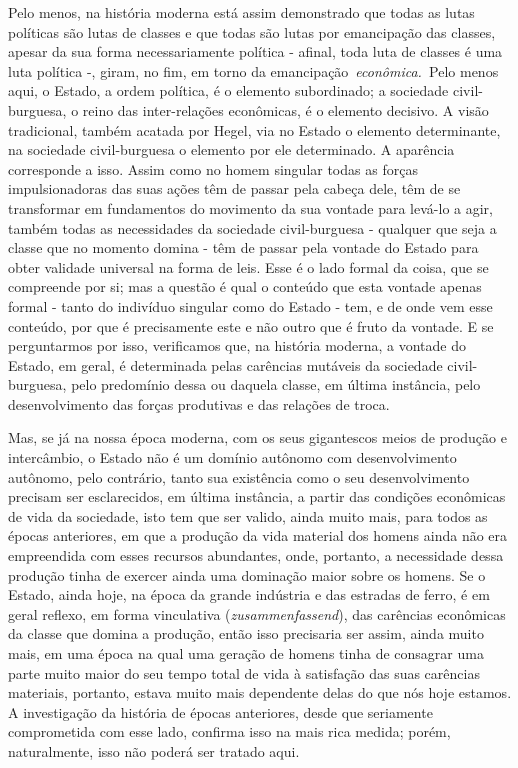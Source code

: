 Pelo menos, na história moderna está assim demonstrado que todas as
lutas políticas são lutas de classes e que todas são lutas por
emancipação das classes, apesar da sua forma necessariamente política -
afinal, toda luta de classes é uma luta política -, giram, no fim, em
torno da emancipação~\emph{econômica.~}Pelo menos aqui, o Estado, a
ordem política, é o elemento subordinado; a sociedade civil-burguesa, o
reino das inter-relações econômicas, é o elemento decisivo. A visão
tradicional, também acatada por Hegel, via no Estado o elemento
determinante, na sociedade civil-burguesa o elemento por ele
determinado. A aparência corresponde a isso. Assim como no homem
singular todas as forças impulsionadoras das suas ações têm de passar
pela cabeça dele, têm de se transformar em fundamentos do movimento da
sua vontade para levá-lo a agir, também todas as necessidades da
sociedade civil-burguesa - qualquer que seja a classe que no momento
domina - têm de passar pela vontade do Estado para obter validade
universal na forma de leis. Esse é o lado formal da coisa, que se
compreende por si; mas a questão é qual o conteúdo que esta vontade
apenas formal - tanto do indivíduo singular como do Estado - tem, e de
onde vem esse conteúdo, por que é precisamente este e não outro que é
fruto da vontade. E se perguntarmos por isso, verificamos que, na
história moderna, a vontade do Estado, em geral, é determinada pelas
carências mutáveis da sociedade civil-burguesa, pelo predomínio dessa ou
daquela classe, em última instância, pelo desenvolvimento das forças
produtivas e das relações de troca.

Mas, se já na nossa época moderna, com os seus gigantescos meios de
produção e intercâmbio, o Estado não é um domínio autônomo com
desenvolvimento autônomo, pelo contrário, tanto sua existência como o
seu desenvolvimento precisam ser esclarecidos, em última instância, a
partir das condições econômicas de vida da sociedade, isto tem que ser
valido, ainda muito mais, para todos as épocas anteriores, em que a
produção da vida material dos homens ainda não era empreendida com esses
recursos abundantes, onde, portanto, a necessidade dessa produção tinha
de exercer ainda uma dominação maior sobre os homens. Se o Estado, ainda
hoje, na época da grande indústria e das estradas de ferro, é em geral
reflexo, em forma vinculativa (\emph{zusammenfassend}), das carências
econômicas da classe que domina a produção, então isso precisaria ser
assim, ainda muito mais, em uma época na qual uma geração de homens
tinha de consagrar uma parte muito maior do seu tempo total de vida à
satisfação das suas carências materiais, portanto, estava muito mais
dependente delas do que nós hoje estamos. A investigação da história de
épocas anteriores, desde que seriamente comprometida com esse lado,
confirma isso na mais rica medida; porém, naturalmente, isso não poderá
ser tratado aqui.

